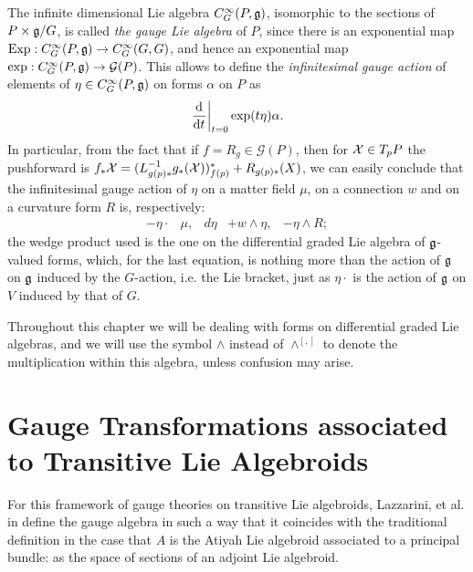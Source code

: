 The infinite dimensional Lie algebra $C^\infty_G(P, \mathfrak{g})$, isomorphic to the sections of $P \times \mathfrak{g}/G$, is called \emph{the gauge Lie algebra} of $P$, since there is an exponential map $\text{Exp}: C^\infty_G(P, \mathfrak{g}) \to C^\infty_G(G, G)$, and hence an exponential map $\text{exp}: C^\infty_G(P, \mathfrak{g}) \to \mathcal G(P)$. This allows to define the \emph{infinitesimal gauge action} of elements of $\eta \in C^\infty_G(P, \mathfrak{g})$ on forms $\alpha$ on $P$ as
\begin{equation}
    \der{t}[t=0]{\text{exp}(t\eta)} \alpha.
\end{equation}
In particular, from the fact that if $f = R_g \in \mathcal G(P)$, then for $\mathcal{X} \in T_pP$ the pushforward is $f_* \mathcal{X} = (L_{g(p) *}^{-1} g_*(\mathcal{X}))^*_{f(p)} + R_{g(p)*}(X)$, we can easily conclude that the infinitesimal gauge action of $\eta$ on a matter field $\mu$, on a connection $w$ and on a curvature form $R$ is, respectively:
\begin{align}
    -\eta \cdot & \mu, &
    d\eta &+ w \wedge \eta, &
    - \eta \wedge  R;
\end{align}
the wedge product used is the one on the differential graded Lie algebra of $\mathfrak{g}$-valued forms, which, for the last equation, is nothing more than the action of $\mathfrak{g}$ on $\mathfrak{g}$ induced by the $G$-action, i.e. the Lie bracket, just as $\eta \cdot$ is the action of $\mathfrak{g}$ on $V$ induced by that of $G$. 

Throughout this chapter we will be dealing with forms on differential graded Lie algebras, and we will use the symbol $\wedge$ instead of $\wedge^{[,]}$ to denote the multiplication within this algebra, unless confusion may arise.

\section{Gauge Transformations associated to Transitive Lie Algebroids}
\label{chGaugeSectionGaugeTransformations}

For this framework of gauge theories on transitive Lie algebroids, Lazzarini, et al. in \cite{Lazzarini2012} define the gauge algebra in such a way that it coincides with the traditional definition in the case that $A$ is the Atiyah Lie algebroid associated to a principal bundle: as the space of sections of an adjoint Lie algebroid.



